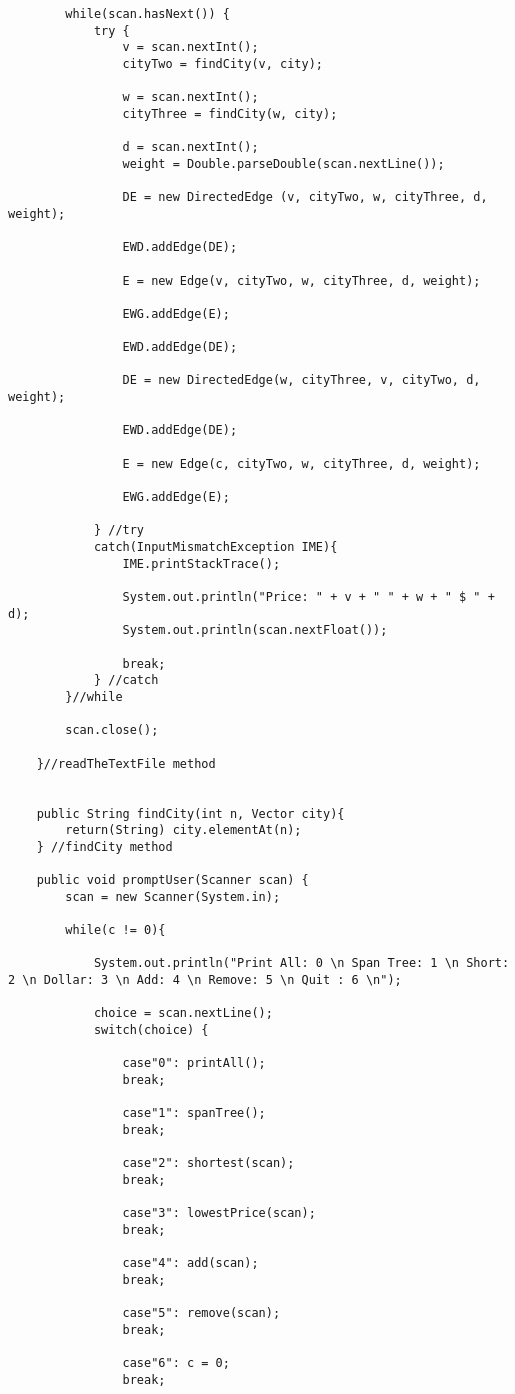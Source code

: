 \documentclass{article}
\begin{document}
\begin{lstlisting}
		while(scan.hasNext()) {
			try {
				v = scan.nextInt();
				cityTwo = findCity(v, city);

				w = scan.nextInt();
				cityThree = findCity(w, city);

				d = scan.nextInt();
				weight = Double.parseDouble(scan.nextLine());

				DE = new DirectedEdge (v, cityTwo, w, cityThree, d, weight);

				EWD.addEdge(DE);

				E = new Edge(v, cityTwo, w, cityThree, d, weight);

				EWG.addEdge(E);

				EWD.addEdge(DE);

				DE = new DirectedEdge(w, cityThree, v, cityTwo, d, weight);

				EWD.addEdge(DE);
				
				E = new Edge(c, cityTwo, w, cityThree, d, weight);

				EWG.addEdge(E);

			} //try
			catch(InputMismatchException IME){
				IME.printStackTrace();

				System.out.println("Price: " + v + " " + w + " $ " + d);
				System.out.println(scan.nextFloat());

				break;
			} //catch
		}//while

		scan.close();

	}//readTheTextFile method 


	public String findCity(int n, Vector city){
		return(String) city.elementAt(n);
	} //findCity method

	public void promptUser(Scanner scan) {
		scan = new Scanner(System.in);

		while(c != 0){

			System.out.println("Print All: 0 \n Span Tree: 1 \n Short: 2 \n Dollar: 3 \n Add: 4 \n Remove: 5 \n Quit : 6 \n");

			choice = scan.nextLine();
			switch(choice) {

				case"0": printAll();
				break;
				
				case"1": spanTree();
				break;

				case"2": shortest(scan);
				break;

				case"3": lowestPrice(scan);
				break;

				case"4": add(scan);
				break;

				case"5": remove(scan);
				break;

				case"6": c = 0;
				break;


\end{lstlisting}
\end{document}
